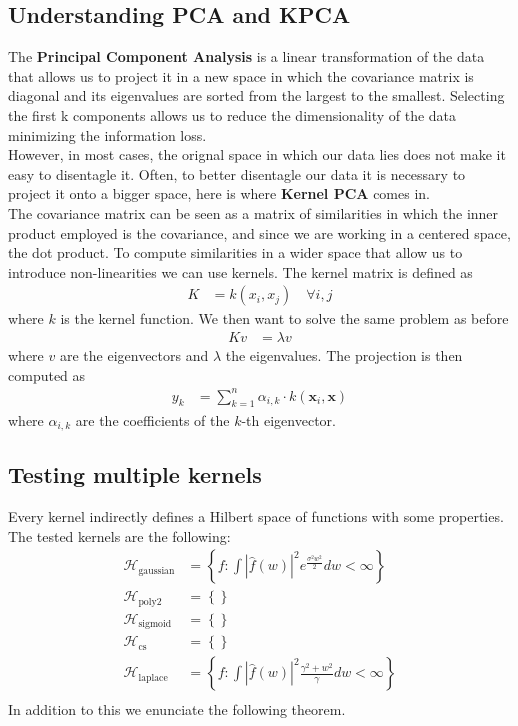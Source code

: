 \subsection{Understanding PCA and KPCA}
The \textbf{Principal Component Analysis} is a linear transformation of the data that allows us to project it in a new space in which the covariance matrix is diagonal and its eigenvalues are sorted from the largest to the smallest. Selecting the first k components allows us to reduce the dimensionality of the data minimizing the information loss. \\
However, in most cases, the orignal space in which our data lies does not make it easy to disentagle it. Often, to better disentagle our data it is necessary to project it onto a bigger space, here is where \textbf{Kernel PCA} comes in. \\
The covariance matrix can be seen as a matrix of similarities in which the inner product employed is the covariance, and since we are working in a centered space, the dot product. To compute similarities in a wider space that allow us to introduce non-linearities we can use kernels.
The kernel matrix is defined as
\begin{align}
    K &= k(x_i, x_j) \quad \forall i, j
\end{align}
where $k$ is the kernel function. We then want to solve the same problem as before
\begin{align}
    K v &= \lambda v
\end{align}
where $v$ are the eigenvectors and $\lambda$ the eigenvalues. The projection is then computed as
\begin{align}
    y_k &= \sum_{k=1}^{n} \alpha_{i,k} \cdot k(\mathbf{x}_i, \mathbf{x})
\end{align}
where $\alpha_{i,k}$ are the coefficients of the $k$-th eigenvector.


\subsection{Testing multiple kernels}
Every kernel indirectly defines a Hilbert space of functions with some
properties. The tested kernels are the following:
\begin{align*}
    \mathcal{H}_{\text{gaussian}}   &= \left\{ f : \int | \hat{f}(w) |^2 e^{\frac{\sigma^2 w^2}{2}} dw < \infty \right\} \\
    \mathcal{H}_{\text{poly2}}      &= \left\{  \right\} \\
    \mathcal{H}_{\text{sigmoid}}    &= \left\{  \right\} \\
    \mathcal{H}_{\text{cs}}         &= \left\{  \right\} \\
    \mathcal{H}_{\text{laplace}}    &= \left\{ f : \int | \hat{f}(w) |^2 \frac{\gamma^2 + w^2}{\gamma} dw < \infty \right\} \\    
\end{align*}
In addition to this we enunciate the following theorem.

